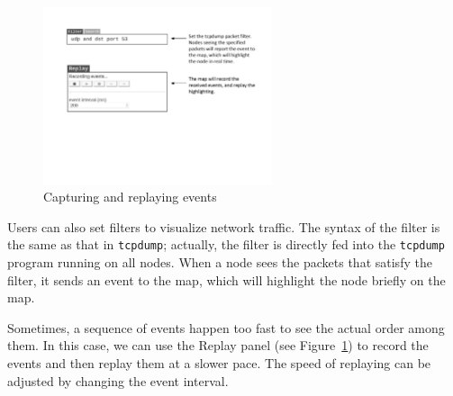

\begin{figure}[htb]
  \begin{center}
        \includegraphics[width=0.6\textwidth]{./Figs/emulator_filter_replay.pdf}
  \end{center}
  \caption{Capturing and replaying events}
  \label{emulator:fig:replay-event}
\end{figure}

Users can also set filters to visualize network traffic.
The syntax of the filter is the same as that in \texttt{tcpdump}; actually,
the filter is directly fed into the \texttt{tcpdump} program running on all nodes.
When a node sees the packets that satisfy the filter, it 
sends an event to the map, which will highlight the node briefly on
the map. 

Sometimes, a sequence of events happen too fast to see the actual order 
among them. In this case, we can use the Replay panel (see 
Figure~\ref{emulator:fig:replay-event}) to record the events and then
replay them at a slower pace. The speed of replaying can be 
adjusted by changing the event interval.


